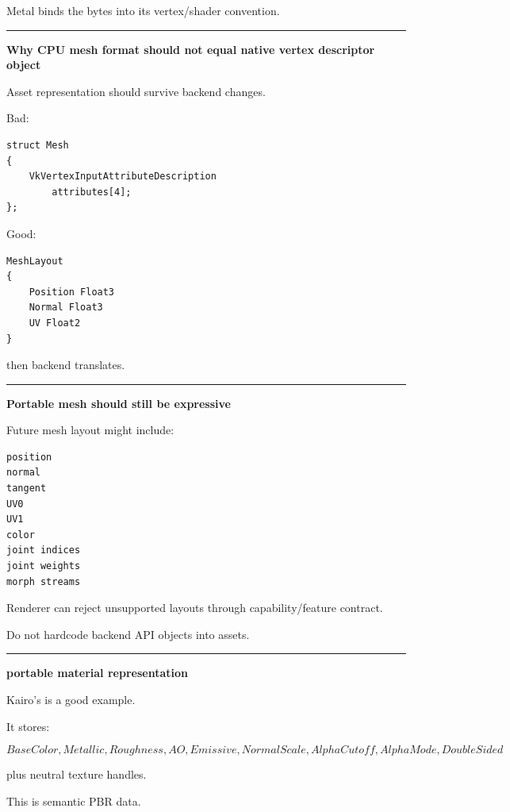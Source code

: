 Metal binds the bytes into its vertex/shader convention.

\begin{center}\rule{0.5\linewidth}{0.5pt}\end{center}

\textbf{Why CPU mesh format should not equal native vertex descriptor object}

Asset representation should survive backend changes.

Bad:

\begin{verbatim}
struct Mesh
{
    VkVertexInputAttributeDescription
        attributes[4];
};
\end{verbatim}

Good:

\begin{verbatim}
MeshLayout
{
    Position Float3
    Normal Float3
    UV Float2
}
\end{verbatim}

then backend translates.

\begin{center}\rule{0.5\linewidth}{0.5pt}\end{center}

\textbf{Portable mesh should still be expressive}

Future mesh layout might include:

\begin{verbatim}
position
normal
tangent
UV0
UV1
color
joint indices
joint weights
morph streams
\end{verbatim}

Renderer can reject unsupported layouts through capability/feature contract.

Do not hardcode backend API objects into assets.

\begin{center}\rule{0.5\linewidth}{0.5pt}\end{center}

\textbf{portable material representation}

Kairo's  is a good example.

It stores:

\[
BaseColor,
Metallic,
Roughness,
AO,
Emissive,
NormalScale,
AlphaCutoff,
AlphaMode,
DoubleSided
\]

plus neutral texture handles.

This is semantic PBR data.

